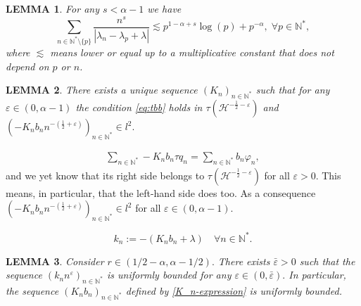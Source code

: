 \documentclass[10pt,a4paper]{amsart}
\newtheorem{lem}{LEMMA}
\begin{document}
\begin{lem}
\label{lem:tech}
For any $s<\alpha-1$ we have
\begin{equation} \sum\limits_{n\in\mathbb{N}^{*}\setminus\{p\}}\frac{n^{s}}{|\lambda_{n}-\lambda_{p}+\lambda|}\lesssim p^{1- \alpha+ s}\log(p)+p^{-\alpha}, \; \forall p\in \mathbb{N}^*,
\end{equation}
where $\lesssim$ means lower or equal up to a multiplicative constant that does not depend on $p$ or $n$.
\end{lem}

\begin{lem}\label{lem:regk}
 There exists a unique sequence $(K_n)_{n\in{\mathbb{N}^*}}$ such that for any $\varepsilon \in (0,\alpha-1)$ the condition \eqref{eq:tbb} holds in $\tau(\mathcal{H}^{-\frac{1}{2}-\varepsilon})$ and $(-K_n b_n n^{-(\frac{1}{2}+\varepsilon)})_{n\in\mathbb{N}^*}\in l^2.$   
\end{lem}

    \begin{align}
   \sum_{n\in \mathbb{N}^*}-K_n b_n \tau q_n=\sum_{n\in \mathbb{N}^*}b_n \varphi_n,\label{TB=B-expression}
\end{align}  and we yet know that its right side belongs to $\tau(\mathcal{H}^{-\frac{1}{2}-\varepsilon})$ for all $\varepsilon>0$. This means, in particular, that the left-hand side does too. As a consequence $(-K_n b_n n^{-(\frac{1}{2}+\varepsilon)})_{n\in \mathbb{N}^*}\in l^2$ for all $\varepsilon \in (0,\alpha-1)$.

 \begin{equation}
 \label{K_n-expression}
    k_n:=-(K_nb_n+\lambda)\quad \forall n\in \mathbb{N}^*.
\end{equation}

  \begin{lem}\label{Lemma-K_n}
Consider $r\in (1/2-\alpha,\alpha-1/2).$ There exists $\bar\varepsilon>0$ such that the sequence $(k_n n^{\varepsilon})_{n\in \mathbb{N}^*}$ is uniformly bounded for any $\varepsilon\in (0,\bar \varepsilon).$ In particular, the sequence $(K_n b_n)_{n\in \mathbb{N}^*}$ defined by \eqref{K_n-expression} is uniformly bounded.
  \end{lem}
\end{document}
